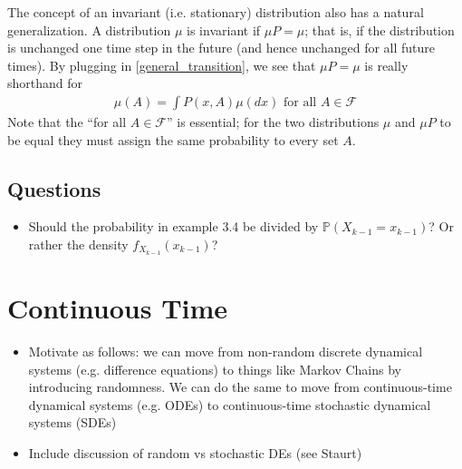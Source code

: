 \documentclass[12pt]{article}
\newcommand{\Prob}{\mathbb{P}}
\begin{document}
The concept of an invariant (i.e. stationary) distribution also has a natural generalization. A 
distribution $\mu$ is invariant if $\mu P = \mu$; that is, if the distribution is unchanged one time step in the future (and hence unchanged for all future times). By plugging in 
\ref{general_transition}, we see that $\mu P = \mu$ is really shorthand for 
\begin{align*}
\mu(A) = \int P(x, A) \mu(dx) \text{ for all } A \in \mathcal{F}
\end{align*}
Note that the ``for all $A \in \mathcal{F}$'' is essential; for the two distributions $\mu$ and $\mu P$ to be equal they must assign the same probability to every set $A$. 

\subsection{Questions}
\begin{itemize}
\item Should the probability in example 3.4 be divided by $\Prob(X_{k-1} = x_{k-1})$? Or rather the density $f_{X_{k-1}}(x_{k-1})$? 
\end{itemize}



\section{Continuous Time}
\begin{itemize}
\item Motivate as follows: we can move from non-random discrete dynamical systems (e.g. difference equations) to things like Markov Chains by introducing randomness. We can do the 
same to move from continuous-time dynamical systems (e.g. ODEs) to continuous-time stochastic dynamical systems (SDEs) 
\item Include discussion of random vs stochastic DEs (see Staurt)
\end{itemize}
\end{document}
